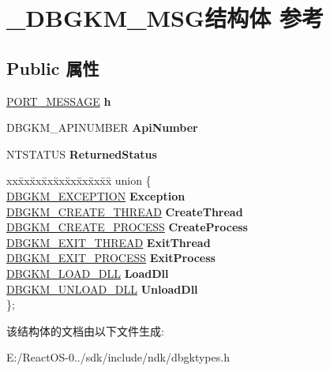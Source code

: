 \hypertarget{struct___d_b_g_k_m___m_s_g}{}\section{\+\_\+\+D\+B\+G\+K\+M\+\_\+\+M\+S\+G结构体 参考}
\label{struct___d_b_g_k_m___m_s_g}
\subsection*{Public 属性}
\begin{DoxyCompactItemize}
\item 
\mbox{\label{struct___d_b_g_k_m___m_s_g_a0040e4cfec8e52b6403c00d30d562713}} 
\hyperlink{struct___p_o_r_t___m_e_s_s_a_g_e___h_e_a_d_e_r}{P\+O\+R\+T\+\_\+\+M\+E\+S\+S\+A\+GE} {\bfseries h}
\item 
\mbox{\label{struct___d_b_g_k_m___m_s_g_ac992bff06baaa31a65b10d02a3ca61fa}} 
D\+B\+G\+K\+M\+\_\+\+A\+P\+I\+N\+U\+M\+B\+ER {\bfseries Api\+Number}
\item 
\mbox{\label{struct___d_b_g_k_m___m_s_g_a077f6adca73326418405ac8185267754}} 
N\+T\+S\+T\+A\+T\+US {\bfseries Returned\+Status}
\item 
\mbox{\label{struct___d_b_g_k_m___m_s_g_a5d158f877df820d87ec2d9673d172cd8}} 
\begin{tabbing}
xx\=xx\=xx\=xx\=xx\=xx\=xx\=xx\=xx\=\kill
union \{\\
\>\hyperlink{struct___d_b_g_k_m___e_x_c_e_p_t_i_o_n}{DBGKM\_EXCEPTION} {\bfseries Exception}\\
\>\hyperlink{struct___d_b_g_k_m___c_r_e_a_t_e___t_h_r_e_a_d}{DBGKM\_CREATE\_THREAD} {\bfseries CreateThread}\\
\>\hyperlink{struct___d_b_g_k_m___c_r_e_a_t_e___p_r_o_c_e_s_s}{DBGKM\_CREATE\_PROCESS} {\bfseries CreateProcess}\\
\>\hyperlink{struct___d_b_g_k_m___e_x_i_t___t_h_r_e_a_d}{DBGKM\_EXIT\_THREAD} {\bfseries ExitThread}\\
\>\hyperlink{struct___d_b_g_k_m___e_x_i_t___p_r_o_c_e_s_s}{DBGKM\_EXIT\_PROCESS} {\bfseries ExitProcess}\\
\>\hyperlink{struct___d_b_g_k_m___l_o_a_d___d_l_l}{DBGKM\_LOAD\_DLL} {\bfseries LoadDll}\\
\>\hyperlink{struct___d_b_g_k_m___u_n_l_o_a_d___d_l_l}{DBGKM\_UNLOAD\_DLL} {\bfseries UnloadDll}\\
\}; \\

\end{tabbing}\end{DoxyCompactItemize}


该结构体的文档由以下文件生成\+:\begin{DoxyCompactItemize}
\item 
E\+:/\+React\+O\+S-\/0../sdk/include/ndk/dbgktypes.\+h\end{DoxyCompactItemize}
